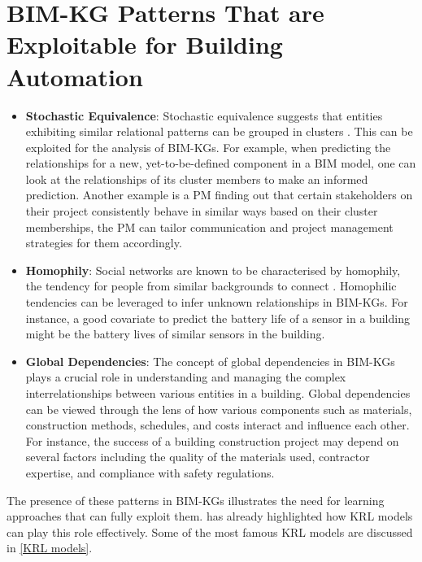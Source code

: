 \section{\ac{BIM-KG} Patterns That are Exploitable for Building Automation}
\label{RL patterns}
\begin{itemize}
    \item 
    \textbf{Stochastic Equivalence}: 
    Stochastic equivalence suggests that entities exhibiting similar relational patterns can be grouped in clusters \citep{Hoff2007ModelingData}. This can be exploited for the analysis of \acp{BIM-KG}. For example, when predicting the relationships for a new, yet-to-be-defined component in a \ac{BIM} model, one can look at the relationships of its cluster members to make an informed prediction. Another example is a \ac{PM} finding out that certain stakeholders on their project consistently behave in similar ways based on their cluster memberships, the PM can tailor communication and project management strategies for them accordingly.
    
    \item
    \textbf{Homophily}: Social networks are known to be characterised by homophily, the tendency for people from similar backgrounds to connect \citep{Hoff2007ModelingData}. Homophilic tendencies can be leveraged to infer unknown relationships in \acp{BIM-KG}. For instance, a good covariate to predict the battery life of a sensor in a building might be the battery lives of similar sensors in the building.

    \item
    \textbf{Global Dependencies}: 
    The concept of global dependencies in \acp{BIM-KG} plays a crucial role in understanding and managing the complex interrelationships between various entities in a building. Global dependencies can be viewed through the lens of how various components such as materials, construction methods, schedules, and costs interact and influence each other. For instance, the success of a building construction project may depend on several factors including the quality of the materials used, contractor expertise, and compliance with safety regulations. 
    
\end{itemize}

The presence of these patterns in \acp{BIM-KG} illustrates the need for learning approaches that can fully exploit them.  has already highlighted how \ac{KRL} models can play this role effectively. Some of the most famous \ac{KRL} models are discussed in \autoref{KRL models}.

